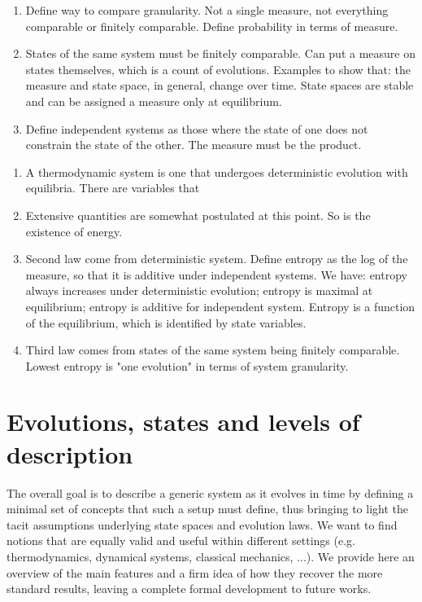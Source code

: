 \documentclass[letterpaper]{article}
\begin{document}
\begin{enumerate}
	\item Define way to compare granularity. Not a single measure, not everything comparable or finitely comparable. Define probability in terms of measure.
	\item States of the same system must be finitely comparable. Can put a measure on states themselves, which is a count of evolutions. Examples to show that: the measure and state space, in general, change over time. State spaces are stable and can be assigned a measure only at equilibrium.
	\item Define independent systems as those where the state of one does not constrain the state of the other. The measure must be the product.
	
\end{enumerate}

\begin{enumerate}
	\item A thermodynamic system is one that undergoes deterministic evolution with equilibria. There are variables that  
	\item Extensive quantities are somewhat postulated at this point. So is the existence of energy.
	\item Second law come from deterministic system.  Define entropy as the log of the measure, so that it is additive under independent systems. We have: entropy always increases under deterministic evolution; entropy is maximal at equilibrium; entropy is additive for independent system. Entropy is a function of the equilibrium, which is identified by state variables.
	\item Third law comes from states of the same system being finitely comparable. Lowest entropy is "one evolution" in terms of system granularity.
	
\end{enumerate}


\section{Evolutions, states and levels of description}

The overall goal is to describe a generic system as it evolves in time by defining a minimal set of concepts that such a setup must define, thus bringing to light the tacit assumptions underlying state spaces and evolution laws. We want to find notions that are equally valid and useful within different settings (e.g. thermodynamics, dynamical systems, classical mechanics, ...). We provide here an overview of the main features and a firm idea of how they recover the more standard results, leaving a complete formal development to future works.
\end{document}
